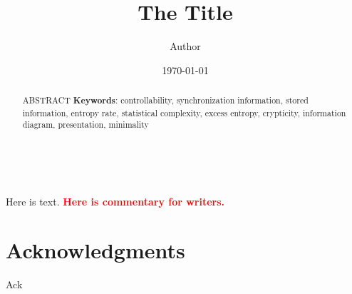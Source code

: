 \documentclass[pre,twocolumn,showpacs,superscriptaddress,preprintnumbers,floatfix]{revtex4}
\theoremstyle{plain}	\newtheorem{Lem}{Lemma}
\theoremstyle{plain}	\newtheorem*{ProLem}{Proof}
\theoremstyle{plain} 	\newtheorem{Cor}{Corollary}
\theoremstyle{plain} 	\newtheorem*{ProCor}{Proof}
\theoremstyle{plain} 	\newtheorem{The}{Theorem}
\theoremstyle{plain} 	\newtheorem*{ProThe}{Proof}
\theoremstyle{plain} 	\newtheorem{Prop}{Proposition}
\theoremstyle{plain} 	\newtheorem*{ProProp}{Proof}
\theoremstyle{plain} 	\newtheorem*{Conj}{Conjecture}
\theoremstyle{plain}	\newtheorem*{Rem}{Remark}
\theoremstyle{plain}	\newtheorem{Def}{Definition}
\theoremstyle{plain}	\newtheorem*{Not}{Notation}
\newcommand{\alert}[1]{\textbf{\textcolor{red}{#1}}}
\begin{document}
\title{The Title}
\author{Author}
\date{\today}


\begin{abstract}
ABSTRACT
\vspace{0.1in}
\noindent
{\bf Keywords}: controllability, synchronization information, stored
information, entropy rate, statistical complexity, excess entropy,
crypticity, information diagram, presentation, minimality

\end{abstract}

%

\maketitle
\

\tableofcontents
{}

Here is text. \alert{Here is commentary for writers.}

\section*{Acknowledgments}

Ack


\end{document}
